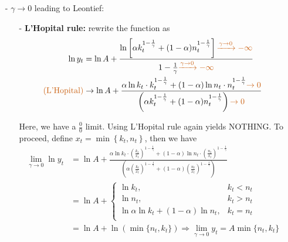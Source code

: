 \documentclass[10pt,landscape,a4paper]{article}
\begin{document}
\begin{multicols*}{4}
\begin{itemize}
    \item[-] $\gamma\rightarrow 0$ leading to Leontief:
    \begin{itemize}
        \item[-] \textbf{L'Hopital rule:} rewrite the function as 
        \begin{align*}
        \ln y_t &= \ln A +\frac{\ln\left[\alpha k_t^{1-\frac{1}{\gamma}}+(1-\alpha)n_t^{1-\frac{1}{\gamma}}\right]{\color{myorange}\xrightarrow{\gamma\rightarrow 0}-\infty}}{1-\frac{1}{\gamma}{\color{myorange}\xrightarrow{\gamma\rightarrow 0}-\infty}}\\
        {\color{myorange}(\text{L'Hopital})}&\rightarrow\ln A+\frac{\alpha \ln k_t\cdot k_t^{1-\frac{1}{\gamma}}+(1-\alpha) \ln n_t\cdot n_t^{1-\frac{1}{\gamma}}{\color{myorange}\rightarrow 0}}{\left(\alpha k_t^{1-\frac{1}{\gamma}}+(1-\alpha)n_t^{1-\frac{1}{\gamma}}\right){\color{myorange}\rightarrow 0}}
        \end{align*}
        
        Here, we have a $\frac{0}{0}$ limit. Using L'Hopital rule again yields NOTHING. To proceed, define $x_t=\min\left\{k_t,n_t\right\}$, then we have
        \begin{align*}
        \lim_{\gamma\rightarrow 0}\ln y_t &=\ln A+\frac{\alpha \ln k_t\cdot \left(\frac{k_t}{x_t}\right)^{1-\frac{1}{\gamma}}+(1-\alpha) \ln n_t\cdot \left(\frac{n_t}{x_t}\right)^{1-\frac{1}{\gamma}}}{\left(\alpha \left(\frac{k_t}{x_t}\right)^{1-\frac{1}{\gamma}}+(1-\alpha)\left(\frac{n_t}{x_t}\right)^{1-\frac{1}{\gamma}}\right)}\\
        &=\ln A +
        \begin{cases}
        \ln k_t, & k_t<n_t\\
        \ln n_t, & k_t>n_t\\
        \ln \alpha\ln k_t +(1-\alpha)\ln n_t, & k_t=n_t\\
        \end{cases}\\
        &=\ln A + \ln(\min\{n_t,k_t\})\Rightarrow \lim_{\gamma\rightarrow 0}y_t = A\min\{n_t,k_t\}
        \end{align*}
        

\end{itemize}
\end{itemize}
\end{multicols*}
\end{document}
